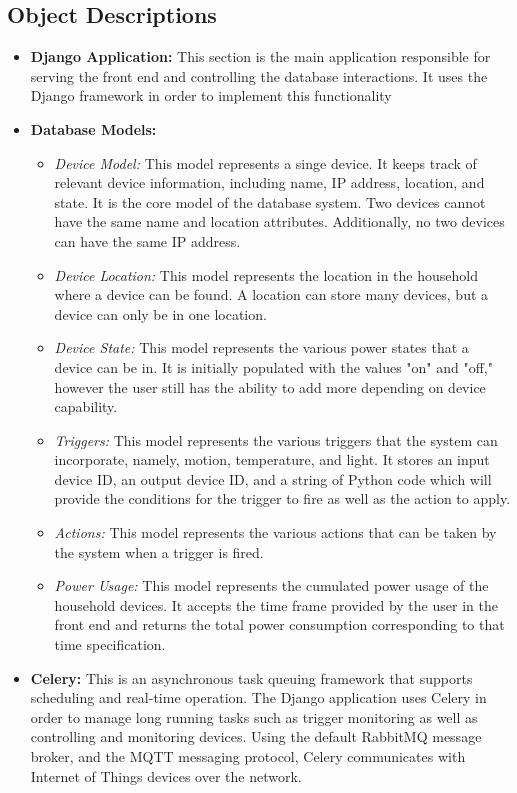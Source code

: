\documentclass[10pt,twocolumn]{witseiepaper}
\begin{document}
	\subsection{Object Descriptions}
	\begin{itemize}
		\item \textbf{Django Application:} This section is the main application responsible for serving the front end and controlling the database interactions. It uses the Django framework in order to implement this functionality 
		\item \textbf{Database Models:} 
		\begin{itemize}
			\item \textit{Device Model:} This model represents a singe device. It keeps track of relevant device information, including name, IP address, location, and state. It is the core model of the database system. Two devices cannot have the same name and location attributes. Additionally, no two devices can have the same IP address. 
			\item \textit{Device Location:} This model represents the location in the household where a device can be found. A location can store many devices, but a device can only be in one location. 
			\item \textit{Device State:} This model represents the various power states that a device can be in. It is initially populated with the values "on" and "off," however the user still has the ability to add more depending on device capability. 
			\item \textit{Triggers:} This model represents the various triggers that the system can incorporate, namely, motion, temperature, and light. 
			It stores an input device ID, an output device ID, and a string of Python code which will provide the conditions for the trigger to fire as well as the action to apply.
			\item \textit{Actions:}  This model represents the various actions that can be taken by the system when a trigger is fired. 
			\item \textit{Power Usage:} This model represents the  cumulated power usage of the household devices. It accepts the time frame provided by the user in the front end and returns the total power consumption corresponding to that time specification.  
		\end{itemize}
		\item \textbf{Celery:} 
		This is an asynchronous task queuing framework that supports scheduling and real-time operation. The Django application uses Celery in order to manage long running tasks such as trigger monitoring as well as controlling and monitoring devices. Using the default RabbitMQ message broker, and the MQTT messaging protocol, Celery communicates with Internet of Things devices over the network. 

\end{itemize}
\end{document}
